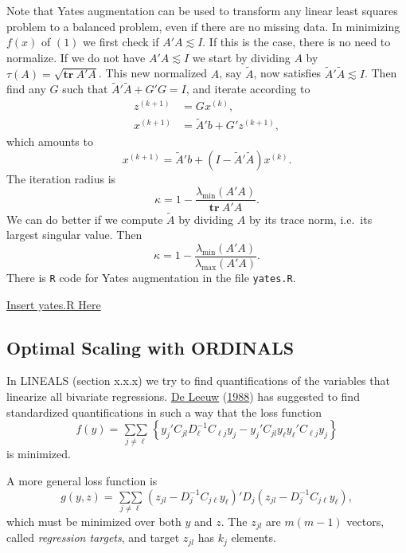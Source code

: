 \documentclass[
  12pt,
]{book}
\begin{document}
Note that Yates augmentation can be used to transform any linear least squares problem to a balanced problem, even if there are no missing data. In minimizing \(f(x)\) of \((1)\) we first check if \(A'A\lesssim I.\) If this is the case, there is no need to normalize. If we do not have \(A'A\lesssim I\) we start by dividing \(A\) by \(\tau(A)=\sqrt{\mathbf{tr}\ A'A}\). This new normalized \(A\), say \(\tilde A\), now satisfies \(\tilde A'\tilde A\lesssim I\). Then find any \(G\) such that \(\tilde A'\tilde A+G'G=I\), and iterate according to
\begin{align*}
z^{(k+1)}&=Gx^{(k)},\\
x^{(k+1)}&=\tilde A'b+G'z^{(k+1)},
\end{align*}
which amounts to
\[
x^{(k+1)}=\tilde A'b+(I-\tilde A'\tilde A)x^{(k)}.
\]
The iteration radius is
\[
\kappa=1-\frac{\lambda_{\text{min}}(A'A)}{\mathbf{tr}\ A'A}.
\]
We can do better if we compute \(\tilde A\) by dividing \(A\) by its trace norm, i.e.~its largest singular value. Then
\[
\kappa=1-\frac{\lambda_{\text{min}}(A'A)}{\lambda_{\text{max}}(A'A)}.
\]
There is \texttt{R} code for Yates augmentation in the file \texttt{yates.R}.

\href{../code/yates.R}{Insert yates.R Here}

\hypertarget{optimal-scaling-with-ordinals}{%
\subsection{Optimal Scaling with ORDINALS}\label{optimal-scaling-with-ordinals}}

In LINEALS (section x.x.x) we try to find quantifications of the variables that linearize all bivariate regressions.
\protect\hyperlink{ref-deleeuw_A_88a}{De Leeuw} (\protect\hyperlink{ref-deleeuw_A_88a}{1988}) has suggested to find standardized quantifications in such a way that the loss function
\[
f(y)=\mathop{\sum\sum}\limits_{j\not=\ell}\left\{y_j'C_{jl}^{\ }D_\ell^{-1}C_{\ell j}^{\ }y_j^{\ }-y_j'C_{jl}^{\ }y_\ell^{\ }y_\ell'C_{\ell j}^{\ }y_j^{\ }\right\}\tag{1}
\]
is minimized.

A more general loss function is
\[
g(y,z)=\mathop{\sum\sum}\limits_{j\not=\ell} (z_{jl}-D_j^{-1}C_{j\ell}y_\ell)'D_j(z_{jl}-D_j^{-1}C_{j\ell}y_\ell),\tag{2}
\]
which must be minimized over both \(y\) and \(z\). The \(z_{jl}\) are \(m(m-1)\) vectors, called \emph{regression targets}, and target \(z_{jl}\) has \(k_j\) elements.
\end{document}
